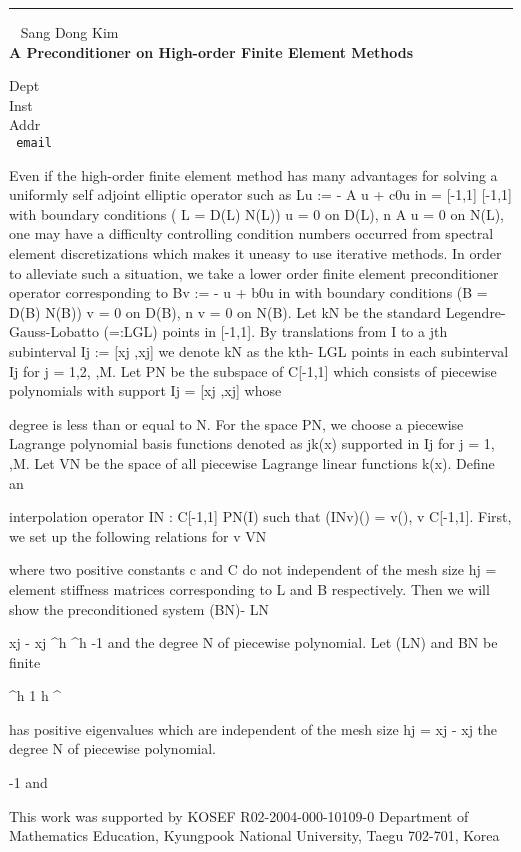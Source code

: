 \documentclass{report}
\begin{document}
\begin{center}

\rule{6in}{1pt} \
{\large
Sang Dong Kim
\\ {\bf
A Preconditioner on High-order Finite Element Methods
}}

Dept
\\
Inst
\\
Addr
\\ {\tt
email
}
\end{center}

Even if the high-order finite element method has many advantages for
solving a uniformly self adjoint elliptic operator such as Lu := -
 A u + c0u in  = [-1,1]  [-1,1] with boundary conditions ( L = D(L)
N(L)) u = 0 on D(L), n  A u = 0 on N(L), one may have a difficulty
controlling condition numbers occurred from spectral element
discretizations which makes it uneasy to use iterative methods.  In
order to alleviate such a situation, we take a lower order finite
element preconditioner operator corresponding to Bv := -  u + b0u in
with boundary conditions (B = D(B)  N(B)) v = 0 on D(B), n  v = 0 on
N(B).  Let {k}N be the standard Legendre-Gauss-Lobatto (=:LGL) points
in [-1,1].  By translations from I to a jth subinterval Ij := [xj ,xj]
we denote {k}N as the kth- LGL points in each subinterval Ij for j =
1,2, ,M.  Let PN be the subspace of C[-1,1] which consists of piecewise
polynomials with support Ij = [xj ,xj] whose

degree is less than or equal to N.  For the space PN, we choose a
piecewise Lagrange polynomial basis functions denoted as {jk(x)}
supported in Ij for j = 1, ,M.  Let VN be the space of all piecewise
Lagrange linear functions k(x).  Define an

interpolation operator IN : C[-1,1]  PN(I) such that (INv)() = v(), v
C[-1,1].  First, we set up the following relations for v  VN

where two positive constants c and C do not independent of the mesh
size hj = element stiffness matrices corresponding to L and B
respectively.  Then we will show the preconditioned system (BN)- LN

xj - xj ^h ^h -1 and the degree N of piecewise polynomial.  Let (LN)
and BN be finite

^h 1 h ^

has positive eigenvalues which are independent of the mesh size hj = xj
- xj the degree N of piecewise polynomial.

-1 and

This work was supported by KOSEF R02-2004-000-10109-0 Department of
Mathematics Education, Kyungpook National University, Taegu 702-701,
Korea
\end{document}
